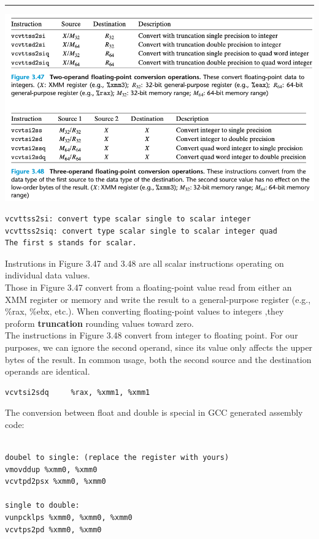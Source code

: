 \documentclass[11pt]{article}
\begin{document}
\noindent\rule{\textwidth}{0.5pt}

\begin{center}
\includegraphics[width=.9\linewidth]{pics/conversion-between-integer-and-floating-point.png}
\end{center}
\begin{verbatim}
vcvttss2si: convert type scalar single to scalar integer
vcvttss2siq: convert type scalar single to scalar integer quad
The first s stands for scalar.
\end{verbatim}
Instrutions in Figure 3.47 and 3.48 are all scalar instructions operating on individual data values.\\

Those in Figure 3.47 convert from a floating-point value read from either an XMM register or memory and write the result to a general-purpose register (e.g., \%rax, \%ebx, etc.). When converting floating-point values to integers ,they proform \textbf{truncation} rounding values toward zero.\\

The instructions in Figure 3.48 convert from integer to floating point. For our purposes, we can ignore the second operand, since its value only affects the upper bytes of the result. In common usage, both the second source and the destination operands are identical.\\
\begin{verbatim}
vcvtsi2sdq     %rax, %xmm1, %xmm1
\end{verbatim}

The conversion between float and double is special in GCC generated assembly code:\\
\begin{verbatim}

doubel to single: (replace the register with yours)
vmovddup %xmm0, %xmm0   
vcvtpd2psx %xmm0, %xmm0

single to double:
vunpcklps %xmm0, %xmm0, %xmm0
vcvtps2pd %xmm0, %xmm0
\end{verbatim}
\end{document}
